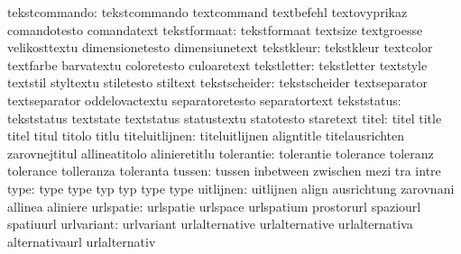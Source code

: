             tekstcommando: tekstcommando             textcommand
                           textbefehl                textovyprikaz
                           comandotesto              comandatext
             tekstformaat: tekstformaat              textsize
                           textgroesse               velikosttextu
                           dimensionetesto           dimensiunetext
               tekstkleur: tekstkleur                textcolor
                           textfarbe                 barvatextu
                           coloretesto               culoaretext
              tekstletter: tekstletter               textstyle
                           textstil                  styltextu
                           stiletesto                stiltext
            tekstscheider: tekstscheider             textseparator
                           textseparator             oddelovactextu
                           separatoretesto           separatortext
              tekststatus: tekststatus               textstate
                           textstatus                statustextu
                           statotesto                staretext
                    titel: titel                     title
                           titel                     titul
                           titolo                    titlu
           titeluitlijnen: titeluitlijnen            aligntitle
                           titelausrichten           zarovnejtitul
                           allineatitolo             alinieretitlu
               tolerantie: tolerantie                tolerance
                           toleranz                  tolerance
                           tolleranza                toleranta
                   tussen: tussen                    inbetween
                           zwischen                  mezi
                           tra                       intre
                     type: type                      type
                           typ                       typ
                           type                      type %
                uitlijnen: uitlijnen                 align
                           ausrichtung               zarovnani
                           allinea                   aliniere
                urlspatie: urlspatie                 urlspace
                           urlspatium                prostorurl
                           spaziourl                 spatiuurl
               urlvariant: urlvariant                urlalternative
                           urlalternative            urlalternativa
                           alternativaurl            urlalternativ
